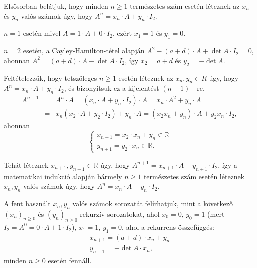 \begin{solution}
Elsősorban belátjuk, hogy minden $n\geq1$ természetes szám esetén
léteznek az $x_{n}$ és $y_{n}$ valós számok úgy, hogy $A^{n}=x_{n}\cdot A+y_{n}\cdot I_{2}$.

$n=1$ esetén mivel $A=1\cdot A+0\cdot I_{2}$, ezért $x_{1}=1$ és
$y_{1}=0$.

$n=2$ esetén, a Cayley-Hamilton-tétel alapján $A^{2}-(a+d)\cdot A+\det A\cdot I_{2}=0$,
ahonnan $A^{2}=(a+d)\cdot A-\det A\cdot I_{2}$, így $x_{2}=a+d$
és $y_{2}=-\det A$.

Feltételezzük, hogy tetszőleges $n\geq1$ esetén léteznek az $x_{n},y_{n}\in R$
úgy, hogy $A^{n}=x_{n}\cdot A+y_{n}\cdot I_{2}$, és bizonyítsuk ez
a kijelentést $(n+1)$ - re. 
\[
\begin{array}{lcl}
A^{n+1} & = & A^{n}\cdot A=(x_{n}\cdot A+y_{n}\cdot I_{2})\cdot A=x_{n}\cdot A^{2}+y_{n}\cdot A\\
 & = & x_{n}(x_{2}\cdot A+y_{2}\cdot I_{2})+y_{n}\cdot A=(x_{2}x_{n}+y_{n})\cdot A+y_{2}x_{n}\cdot I_{2},
\end{array}
\]
ahonnan 
\[
\left\{ \begin{array}{l}
x_{n+1}=x_{2}\cdot x_{n}+y_{n}\in\mathbb{R}\\
y_{n+1}=y_{2}\cdot x_{n}\in\mathbb{R}.
\end{array}\right.
\]

Tehát léteznek $x_{n+1},y_{n+1}\in\mathbb{R}$ úgy, hogy $A^{n+1}=x_{n+1}\cdot A+y_{n+1}\cdot I_{2}$,
így a matematikai indukció alapján bármely $n\geq1$ természetes szám
esetén léteznek $x_{n},y_{n}$ valós számok úgy, hogy $A^{n}=x_{n}\cdot A+y_{n}\cdot I_{2}$.

A fent használt $x_{n},y_{n}$ valós számok sorozatát felírhatjuk,
mint a következő $(x_{n})_{n\geq0}$ és $(y_{n})_{n\geq0}$ rekurzív
sorozatokat, ahol $x_{0}=0$, $y_{0}=1$ (mert $I_{2}=A^{0}=0\cdot A+1\cdot I_{2}$),
$x_{1}=1$, $y_{1}=0$, ahol a rekurrens összefüggés: 
\[
\begin{array}{l}
x_{n+1}=(a+d)\cdot x_{n}+y_{n}\\
y_{n+1}=-\det A\cdot x_{n},
\end{array}
\]
minden $n\geq0$ esetén fennáll.


\end{solution}
